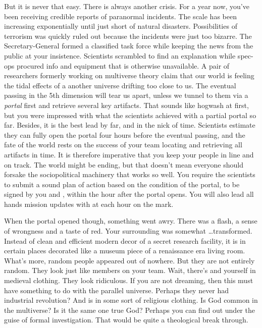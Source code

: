 \documentclass[char]{guildcamp3}
\begin{document}
But it is never that easy. There is always another crisis. For a year now, you've been receiving credible reports of paranormal incidents. The scale has been increasing exponentially until just short of natural disasters. Possibilities of terrorism was quickly ruled out because the incidents were just too bizarre. The Secretary-General formed a classified task force while keeping the news from the public at your insistence. Scientists scrambled to find an explanation while spec-ops procured info and equipment that is otherwise unavailable. A pair of researchers formerly working on multiverse theory claim that our world is feeling the tidal effects of a another universe drifting too close to us. The eventual passing in the 5th dimension will tear us apart, unless we tunnel to them via a \emph{portal} first and retrieve several key artifacts. That sounds like hogwash at first, but you were impressed with what the scientists achieved with a partial portal so far. Besides, it is the best lead by far, and in the nick of time. Scientists estimate they can fully open the portal four hours before the eventual passing, and the fate of the world rests on the success of your team locating and retrieving all artifacts in time. It is therefore imperative that you keep your people in line and on track. The world might be ending, but that doesn't mean everyone should forsake the sociopolitical machinery that works so well. You require the scientists to submit a sound plan of action based on the condition of the portal, to be signed by you and \cPoliTwo{}, within the hour after the portal opens. You will also lead all hands mission updates with \cPoliTwo{} at each hour on the mark. 

When the portal opened though, something went awry. There was a flash, a sense of wrongness and a taste of red. Your surrounding was somewhat \ldots transformed. Instead of clean and efficient modern decor of a secret research facility, it is in certain places decorated like a museum piece of a renaissance era living room. What's more, random people appeared out of nowhere. But they are not entirely random. They look just like members on your team. Wait, there's \cPoliTwo{} and yourself in medieval clothing. They look ridiculous. If you are not dreaming, then this must have something to do with the parallel universe. Perhaps they never had industrial revolution? And \cTech{} is in some sort of religious clothing. Is God common in the multiverse? Is it the same one true God? Perhaps you can find out under the guise of formal investigation. That would be quite a theological break through.
\end{document}

